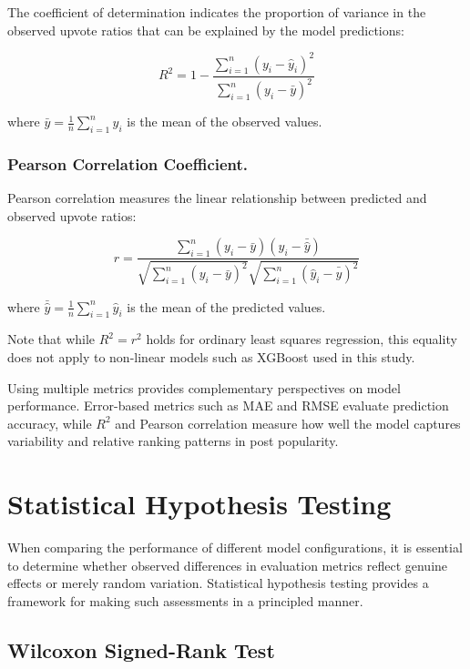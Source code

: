 The coefficient of determination indicates the proportion of variance in the observed upvote ratios that can be explained by the model predictions:

\begin{equation}
R^2 = 1 - \frac{\sum_{i=1}^{n}(y_i - \hat{y}_i)^2}{\sum_{i=1}^{n}(y_i - \bar{y})^2}
\end{equation}

where $\bar{y} = \frac{1}{n}\sum_{i=1}^{n}y_i$ is the mean of the observed values.

\subsubsection*{Pearson Correlation Coefficient.} 

Pearson correlation measures the linear relationship between predicted and observed upvote ratios:

\begin{equation}
r = \frac{\sum_{i=1}^{n}(y_i - \bar{y})(\hat{y}_i - \bar{\hat{y}})}{\sqrt{\sum_{i=1}^{n}(y_i - \bar{y})^2}\sqrt{\sum_{i=1}^{n}(\hat{y}_i - \bar{\hat{y}})^2}}
\end{equation}

where $\bar{\hat{y}} = \frac{1}{n}\sum_{i=1}^{n}\hat{y}_i$ is the mean of the predicted values.

Note that while $R^2 = r^2$ holds for ordinary least squares regression, this equality does not apply to non-linear models such as XGBoost used in this study.

Using multiple metrics provides complementary perspectives on model performance. Error-based metrics such as MAE and RMSE evaluate prediction accuracy, while $R^2$ and Pearson correlation measure how well the model captures variability and relative ranking patterns in post popularity.

\section{Statistical Hypothesis Testing}
\label{sec:statistical_testing}

When comparing the performance of different model configurations, it is essential to determine whether observed differences in evaluation metrics reflect genuine effects or merely random variation. Statistical hypothesis testing provides a framework for making such assessments in a principled manner.

\subsection{Wilcoxon Signed-Rank Test}
\label{subsec:wilcoxon}

